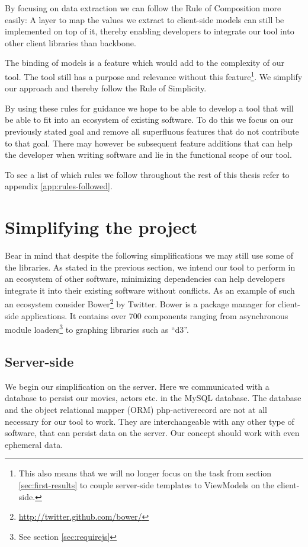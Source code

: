 \documentclass[thesis.tex]{subfiles}
\begin{document}
By focusing on data extraction we can follow the Rule of Composition more
easily: A layer to map the values we extract to client-side models can still be
implemented on top of it, thereby enabling developers to integrate our tool into
other client libraries than backbone.

The binding of models is a feature which would add to the complexity of our
tool. The tool still has a purpose and relevance without this
feature\footnote{This also means that we will no longer focus on the task from
	section \ref{sec:first-results} to couple server-side templates to ViewModels
	on the client-side.}.
We simplify our approach and thereby follow the Rule of Simplicity.

By using these rules for guidance we hope to be able to develop a tool that will
be able to fit into an ecosystem of existing software.
To do this we focus on our previously stated goal and remove all superfluous
features that do not contribute to that goal.
There may however be subsequent feature additions that can help the developer
when writing software and lie in the functional scope of our tool.

To see a list of which rules we follow throughout the rest of this thesis
refer to appendix \ref{app:rules-followed}.

\section{Simplifying the project}
\label{sec:simplifying}
Bear in mind that despite the following simplifications we may still use some
of the libraries.
As stated in the previous section, we intend our tool to perform in an ecosystem
of other software, minimizing dependencies can help developers integrate it into
their existing software without conflicts. As an example of such an ecosystem
consider Bower\footnote{\url{http://twitter.github.com/bower/}} by Twitter.
Bower is a package manager for client-side applications. It contains over 700
components ranging from asynchronous module
loaders\footnote{See section \ref{sec:requirejs}} to graphing libraries such
as ``d3''.

\subsection{Server-side}
\label{sec:simple-server}
We begin our simplification on the server. Here we communicated with a database
to persist our movies, actors etc. in the MySQL database. The database and the
object relational mapper (ORM) php-activerecord are not at all necessary for our
tool to work. They are interchangeable with any other type of software, that can
persist data on the server. Our concept should work with even ephemeral data.
\end{document}
